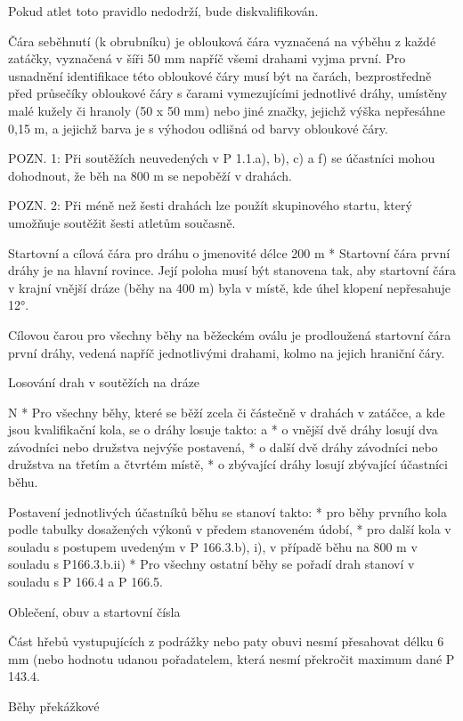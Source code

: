 Pokud atlet toto pravidlo nedodrží, bude diskvalifikován.

Čára seběhnutí (k obrubníku) je oblouková čára vyznačená na výběhu z každé zatáčky, vyznačená v šíři 50 mm napříč všemi drahami vyjma první. Pro usnadnění identifikace této obloukové čáry musí být na čarách, bezprostředně před průsečíky obloukové čáry s čarami vymezujícími jednotlivé dráhy, umístěny malé kužely či hranoly (50 x 50 mm) nebo jiné značky, jejichž výška nepřesáhne 0,15 m, a jejichž barva je s výhodou odlišná od barvy obloukové čáry.

POZN. 1: Při soutěžích neuvedených v P 1.1.a), b), c) a f) se účastníci mohou dohodnout, že běh na 800 m se nepoběží v drahách.

POZN. 2: Při méně než šesti drahách lze použít skupinového startu, který umožňuje soutěžit šesti atletům současně.

Startovní a cílová čára pro dráhu o jmenovité délce 200 m
* Startovní čára první dráhy je na hlavní rovince. Její poloha musí být stanovena tak, aby startovní čára v krajní vnější dráze (běhy na 400 m) byla v místě, kde úhel klopení nepřesahuje 12°.

Cílovou čarou pro všechny běhy na běžeckém oválu je prodloužená startovní čára první dráhy, vedená napříč jednotlivými drahami, kolmo na jejich hraniční čáry.
\enditems

\secc Losování drah v soutěžích na dráze

\begitems \style N
* Pro všechny běhy, které se běží zcela či částečně v drahách v zatáčce, a kde jsou kvalifikační kola, se o dráhy losuje takto:
  \begitems \style a
  * o vnější dvě dráhy losují dva závodníci nebo družstva nejvýše postavená,
  * o další dvě dráhy závodníci nebo družstva na třetím a čtvrtém místě,
  * o zbývající dráhy losují zbývající účastníci běhu.

  Postavení jednotlivých účastníků běhu se stanoví takto:
  * pro běhy prvního kola podle tabulky dosažených výkonů v předem stanoveném údobí,
  * pro další kola v souladu s postupem uvedeným v P 166.3.b), i), v případě běhu na 800 m v souladu s P166.3.b.ii)
  \enditems
* Pro všechny ostatní běhy se pořadí drah stanoví v souladu s P 166.4 a P 166.5.
\enditems

\secc Oblečení, obuv a startovní čísla

Část hřebů vystupujících z podrážky nebo paty obuvi nesmí přesahovat délku 6 mm (nebo hodnotu udanou pořadatelem, která nesmí překročit maximum dané P 143.4.

\secc Běhy překážkové

